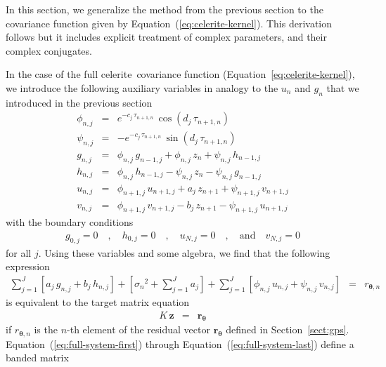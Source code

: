 \documentclass[manuscript, letterpaper]{aastex6}
\makeatletter
\let\origsubsection\subsection
\renewcommand\subsection{\@ifstar{\starsubsection}{\nostarsubsection}}
\newcommand\nostarsubsection[1]{\subsectionprelude\origsubsection{#1}}
\newcommand\starsubsection[1]{\subsectionprelude\origsubsection*{#1}}
\newcommand\subsectionprelude{\vspace{1em}}
\newcommand{\project}[1]{\textsf{#1}}
\newcommand{\celerite}{\project{celerite}}
\renewcommand{\eqref}[1]{\ref{eq:#1}}
\newcommand{\Eq}[1]{Equation~(\eqref{#1})}
\newcommand{\eq}[1]{\Eq{#1}}
\newcommand{\eqalt}[1]{Equation~\eqref{#1}}
\newcommand{\eqlabel}[1]{\label{eq:#1}}
\newcommand{\sectionname}{Section}
\newcommand{\sectref}[1]{\ref{sect:#1}}
\newcommand{\Sect}[1]{\sectionname~\sectref{#1}}
\newcommand{\sect}[1]{\Sect{#1}}
\newcommand{\bvec}[1]{{\ensuremath{\boldsymbol{#1}}}}
\makeatother
\begin{document}
\subsection{The algorithm}

In this section, we generalize the method from the previous section to the
covariance function given by \eq{celerite-kernel}.
This derivation follows \citet{Ambikasaran:2015} but it includes explicit
treatment of complex parameters, and their complex conjugates.

In the case of the full \celerite\ covariance function
(\eqalt{celerite-kernel}), we introduce the following auxiliary variables in
analogy to the $u_n$ and $g_n$ that we introduced in the previous section
\begin{eqnarray}\eqlabel{full-system-first}
\phi_{n,j} &=& e^{-c_j\,\tau_{n+1,n}}\,\cos\left(d_j\,\tau_{n+1,n}\right)\\
\psi_{n,j} &=& -e^{-c_j\,\tau_{n+1,n}}\,\sin\left(d_j\,\tau_{n+1,n}\right)\\
g_{n,j} &=& \phi_{n,j}\,g_{n-1,j} + \phi_{n,j}\,z_n + \psi_{n,j}\,h_{n-1,j}\\
h_{n,j} &=& \phi_{n,j}\,h_{n-1,j} - \psi_{n,j}\,z_n - \psi_{n,j}\,g_{n-1,j}\\
u_{n,j} &=& \phi_{n+1,j}\,u_{n+1,j} + a_j\,z_{n+1} + \psi_{n+1,j}\,v_{n+1,j}\\
v_{n,j} &=& \phi_{n+1,j}\,v_{n+1,j} - b_j\,z_{n+1} - \psi_{n+1,j}\,u_{n+1,j}
\end{eqnarray}
with the boundary conditions
\begin{eqnarray}
    g_{0,j} = 0 \quad, \quad
    h_{0,j} = 0 \quad, \quad
    u_{N,j} = 0 \quad, \quad\mathrm{and}\quad
    v_{N,j} = 0
\end{eqnarray}
for all $j$.
Using these variables and some algebra, we find that the following expression
\begin{eqnarray}\eqlabel{full-system-last}
\sum_{j=1}^J \left[a_j\,g_{n,j}+b_j\,h_{n,j}\right]
+ \left[{\sigma_n}^2+\sum_{j=1}^J a_j\right]
+ \sum_{j=1}^J \left[\phi_{n,j}\,u_{n,j}+\psi_{n,j}\,v_{n,j}\right]
    &=& r_{\bvec{\theta},n}
\end{eqnarray}
is equivalent to the target matrix equation
\begin{eqnarray}
K\,\bvec{z} &=& \bvec{r}_\bvec{\theta}
\end{eqnarray}
if $r_{\bvec{\theta},n}$ is the $n$-th element of the residual vector
$\bvec{r}_\bvec{\theta}$ defined in \sect{gps}.
\eq{full-system-first} through \eq{full-system-last} define a banded matrix
\end{document}
